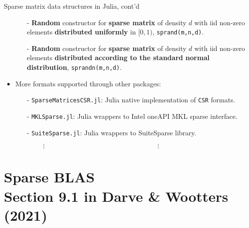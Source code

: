 \documentclass[t,usepdftitle=false]{beamer}
\begin{document}
\begin{frame}{Sparse matrix data structures in Julia, cont'd}
\begin{itemize}
\item[]
\begin{itemize}
\item[-] \textbf{Random} constructor for \textbf{sparse matrix} of density $d$ with iid non-zero elements \textbf{distributed uniformly} in $[0,1)$, \texttt{sprand(m,n,d)}.\vspace{.05cm}
\item[-] \textbf{Random} constructor for \textbf{sparse matrix} of density $d$ with iid non-zero elements \textbf{distributed according to the standard normal distribution}, \texttt{sprandn(m,n,d)}.
\end{itemize}
\item More formats supported through other packages:
\begin{itemize}\normalsize
\item[-] \texttt{SparseMatricesCSR.jl}: Julia native implementation of \texttt{CSR} formats.\vspace{.05cm}
\item[-] \texttt{MKLSparse.jl}: Julia wrappers to Intel oneAPI MKL sparse interface.\vspace{.05cm}
\item[-] \texttt{SuiteSparse.jl}: Julia wrappers to SuiteSparse library.\vspace{.05cm}
\item[] $\hspace{1cm}\vdots\hspace{7cm}\vdots$
\end{itemize}
\end{itemize}
\end{frame}

\section{Sparse BLAS\\{\small Section 9.1 in Darve \& Wootters (2021)}}
\end{document}
